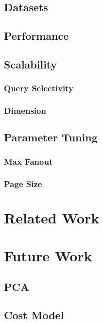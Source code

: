 \documentclass[sigconf,10pt]{acmart}
\begin{document}
\subsection{Datasets}

\subsection{Performance}

\subsection{Scalability}

\subsubsection{Query Selectivity}

\subsubsection{Dimension}

\subsection{Parameter Tuning}

\subsubsection{Max Fanout}

\subsubsection{Page Size}

\section{Related Work}

\section{Future Work}

\subsection{PCA}

\subsection{Cost Model}
\end{document}
